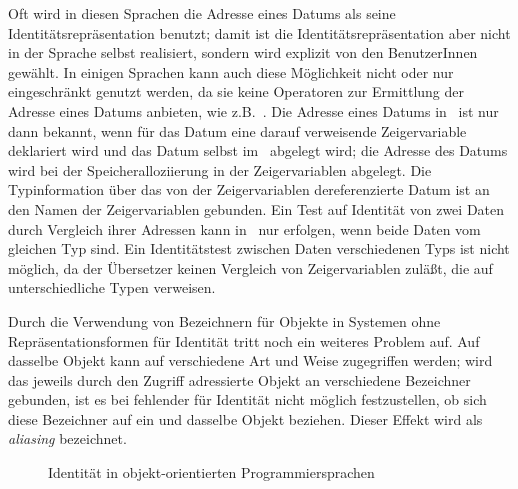 %
\par{}Oft wird in diesen Sprachen die Adresse eines
Datums als seine Identit\"{a}tsrepr\"{a}sentation benutzt; damit ist
die Identit\"{a}tsrepr\"{a}sentation aber nicht in der Sprache
selbst realisiert, sondern wird explizit von den BenutzerInnen
gew\"{a}hlt. In einigen
Sprachen kann auch diese M\"{o}glichkeit nicht oder nur eingeschr\"{a}nkt
genutzt werden, da sie keine Operatoren zur Ermittlung der Adresse
eines Datums anbieten, wie z.B.\ \pascal. Die Adresse eines Datums in
\pascal\ ist nur dann bekannt, wenn f\"{u}r das Datum eine darauf
verweisende Zeigervariable deklariert wird und das Datum selbst im
\heap\ abgelegt wird; die Adresse des Datums wird bei der
Speicheralloziierung in der Zeigervariablen abgelegt. Die
Typinformation \"{u}ber das von der Zeigervariablen dereferenzierte Datum
ist an den Namen der Zeigervariablen gebunden. Ein Test auf
Identit\"{a}t von zwei Daten durch Vergleich ihrer Adressen kann in
\pascal\ nur erfolgen, wenn beide Daten vom gleichen Typ sind. Ein
Identit\"{a}tstest zwischen Daten verschiedenen Typs ist nicht
m\"{o}glich, da der \"{U}bersetzer keinen Vergleich von Zeigervariablen
zul\"{a}\ss{}t, die auf unterschiedliche Typen verweisen.
%
\par{}Durch die Verwendung von Bezeichnern f\"{u}r Objekte
in Systemen ohne Re\-pr\"{a}\-sen\-ta\-tions\-for\-men f\"{u}r Identit\"{a}t
tritt noch ein weiteres Problem auf. Auf dasselbe Objekt kann auf
verschiedene Art und Weise zugegriffen werden; wird das jeweils durch
den Zugriff adressierte Objekt an verschiedene Bezeichner gebunden,
ist es bei fehlender \representationform{} f\"{u}r Identit\"{a}t nicht
m\"{o}glich festzustellen, ob sich diese Bezeichner auf ein und dasselbe
Objekt beziehen. Dieser Effekt wird als {\em aliasing\/} bezeichnet.
%
\begin{figure}[htbp]%
\ifbuch%
\centerline{}%
\else%
\centerline{}%
\fi%
\caption{Identit\"{a}t in objekt-orientierten Programmiersprachen}%
\label{fig:ooiden}%
\end{figure}%
%
